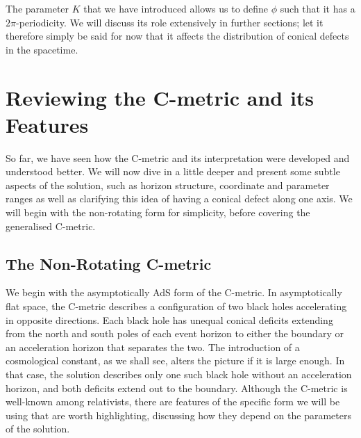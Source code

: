 \documentclass[
twoside,
openright,
frontopenright
]{dmathesis}
\begin{document}
The parameter $K$ that we have introduced allows us to define $\phi$ such that
it has a $2\pi$-periodicity. We will discuss its role extensively in further
sections; let it therefore simply be said for now that it affects the
distribution of conical defects in the spacetime.


\section{Reviewing the C-metric and its Features}
\label{sec:cmet-review}

So far, we have seen how the C-metric and its interpretation were developed and
understood better. We will now dive in a little deeper and present some subtle
aspects of the solution, such as horizon structure, coordinate and parameter
ranges as well as clarifying this idea of having a conical defect along one
axis. We will begin with the non-rotating form for simplicity, before covering
the generalised C-metric.

\subsection{The Non-Rotating C-metric}
We begin with the asymptotically AdS form of the C-metric. In
asymptotically flat space, the C-metric describes a configuration of two black
holes accelerating in opposite directions. Each black hole has unequal conical
deficits extending from the north and south poles of each event horizon to
either the boundary or an acceleration horizon that separates the two. The
introduction of a cosmological constant, as we shall see, alters the picture if
it is large enough. In that case, the solution describes only one such black
hole without an acceleration horizon, and both deficits extend out to the
boundary. Although the C-metric is well-known among relativists,
there are features of the specific form we will be using that are worth
highlighting, discussing how they depend on the parameters of the solution.
\end{document}
